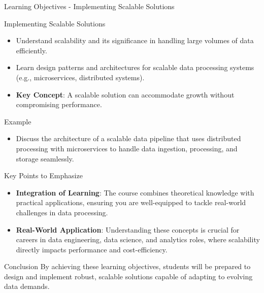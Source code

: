 \documentclass[aspectratio=169]{beamer}
\begin{document}
\begin{frame}[fragile]{Learning Objectives - Implementing Scalable Solutions}
    \begin{block}{Implementing Scalable Solutions}
        \begin{itemize}
            \item Understand scalability and its significance in handling large volumes of data efficiently.
            \item Learn design patterns and architectures for scalable data processing systems (e.g., microservices, distributed systems).
            \item \textbf{Key Concept}: A scalable solution can accommodate growth without compromising performance.
        \end{itemize}
    \end{block}

    \begin{block}{Example}
        \begin{itemize}
            \item Discuss the architecture of a scalable data pipeline that uses distributed processing with microservices to handle data ingestion, processing, and storage seamlessly.
        \end{itemize}
    \end{block}
\end{frame}

\begin{frame}[fragile]{Key Points to Emphasize}
    \begin{itemize}
        \item \textbf{Integration of Learning}: The course combines theoretical knowledge with practical applications, ensuring you are well-equipped to tackle real-world challenges in data processing.
        \item \textbf{Real-World Application}: Understanding these concepts is crucial for careers in data engineering, data science, and analytics roles, where scalability directly impacts performance and cost-efficiency.
    \end{itemize}

    \begin{block}{Conclusion}
        By achieving these learning objectives, students will be prepared to design and implement robust, scalable solutions capable of adapting to evolving data demands.
    \end{block}
\end{frame}
\end{document}
